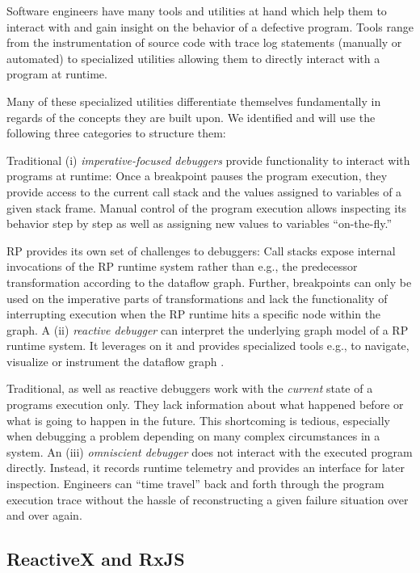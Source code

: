 \documentclass[12pt,a4paper]{article}
\begin{document}
Software engineers have many tools and utilities at hand which help them to interact with and gain insight on the behavior of a defective program. Tools range from the instrumentation of source code with trace log statements (manually or automated) to specialized utilities allowing them to directly interact with a program at runtime.

Many of these specialized utilities differentiate themselves fundamentally in regards of the concepts they are built upon. We identified and will use the following three categories to structure them:

 Traditional (i) \emph{imperative-focused debuggers} provide functionality to interact with programs at runtime: Once a breakpoint pauses the program execution, they provide access to the current call stack and the values assigned to variables of a given stack frame. Manual control of the program execution allows inspecting its behavior step by step as well as assigning new values to variables ``on-the-fly.''

RP provides its own set of challenges to debuggers: Call stacks expose internal invocations of the RP runtime system rather than e.g., the predecessor transformation according to the dataflow graph. Further, breakpoints can only be used on the imperative parts of transformations and lack the functionality of interrupting execution when the RP runtime hits a specific node within the graph. A (ii) \emph{reactive debugger} can interpret the underlying graph model of a RP runtime system. It leverages on it and provides specialized tools e.g., to navigate, visualize or instrument the dataflow graph \cite{10.1145/2884781.2884815} \cite{10.1145/3180155.3180156} \cite{rxviz}.

Traditional, as well as reactive debuggers work with the \emph{current} state of a programs execution only. They lack information about what happened before or what is going to happen in the future. This shortcoming is tedious, especially when debugging a problem depending on many complex circumstances in a system. An (iii) \emph{omniscient debugger} \cite{5287015} \cite{DBLP:journals/corr/OCallahanJFHNP17} does not interact with the executed program directly. Instead, it records runtime telemetry and provides an interface for later inspection. Engineers can ``time travel'' back and forth through the program execution trace without the hassle of reconstructing a given failure situation over and over again.

\subsection{ReactiveX and RxJS}
\end{document}
